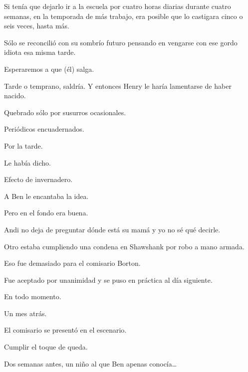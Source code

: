 \sk
Si tenía que dejarlo ir a la escuela por cuatro horas
diarias durante cuatro semanas, en la temporada
de más trabajo, era posible que lo castigara cinco o
seis veces, hasta más.

\sk
Sólo se reconcilió con su
sombrío futuro pensando en vengarse con ese
gordo idiota esa misma tarde.
\nb{}

\sk
Esperaremos a que (él) salga.

\sk
Tarde o temprano, saldría. Y entonces Henry le
haría lamentarse de haber nacido.

\sk
Quebrado sólo por susurros
ocasionales. 

\sk
Periódicos encuadernados. 

\sk
Por la tarde. 

\sk
Le había dicho. 

\sk
Efecto de invernadero. 

\sk
A Ben le encantaba la idea.\nb{}

\sk
Pero en el fondo era buena. 

\sk
Andi no deja de preguntar dónde está su mamá y
yo no sé qué decirle. 

\sk
Otro estaba cumpliendo
una condena en Shawshank por robo a mano armada.

\sk
Eso fue demasiado para el comisario Borton. 

\sk
Fue aceptado por
unanimidad y se puso en práctica al día siguiente.

\sk
En todo momento. 

\sk
Un mes atrás. 

\sk
El comisario se presentó en el escenario. 

\sk
Cumplir el toque de queda. 

\sk
Dos semanas antes, un niño al que Ben apenas
conocía\ldots{} 

